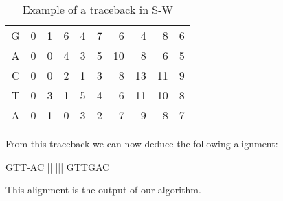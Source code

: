 \begin{enumerate}
\begin{table}[H]
\begin{tabular}{rrrrrrrrrr}
			\multicolumn{1}{r|}{G} & \multicolumn{1}{r|}{0} & \multicolumn{1}{r|}{1}                         & \multicolumn{1}{r|}{6}                         & \multicolumn{1}{r|}{4}                         & \multicolumn{1}{r|}{\cellcolor[HTML]{DAE8FC}7} & \multicolumn{1}{r|}{6}                          & \multicolumn{1}{r|}{4}                          & \multicolumn{1}{r|}{8}  & \multicolumn{1}{r|}{6} \\ \cline{2-10} 
			\multicolumn{1}{r|}{A} & \multicolumn{1}{r|}{0} & \multicolumn{1}{r|}{0}                         & \multicolumn{1}{r|}{4}                         & \multicolumn{1}{r|}{3}                         & \multicolumn{1}{r|}{5}                         & \multicolumn{1}{r|}{\cellcolor[HTML]{DAE8FC}10} & \multicolumn{1}{r|}{8}                          & \multicolumn{1}{r|}{6}  & \multicolumn{1}{r|}{5} \\ \cline{2-10} 
			\multicolumn{1}{r|}{C} & \multicolumn{1}{r|}{0} & \multicolumn{1}{r|}{0}                         & \multicolumn{1}{r|}{2}                         & \multicolumn{1}{r|}{1}                         & \multicolumn{1}{r|}{3}                         & \multicolumn{1}{r|}{8}                          & \multicolumn{1}{r|}{\cellcolor[HTML]{34CDF9}13} & \multicolumn{1}{r|}{11} & \multicolumn{1}{r|}{9} \\ \cline{2-10} 
			\multicolumn{1}{r|}{T} & \multicolumn{1}{r|}{0} & \multicolumn{1}{r|}{3}                         & \multicolumn{1}{r|}{1}                         & \multicolumn{1}{r|}{5}                         & \multicolumn{1}{r|}{4}                         & \multicolumn{1}{r|}{6}                          & \multicolumn{1}{r|}{11}                         & \multicolumn{1}{r|}{10} & \multicolumn{1}{r|}{8} \\ \cline{2-10} 
			\multicolumn{1}{r|}{A} & \multicolumn{1}{r|}{0} & \multicolumn{1}{r|}{1}                         & \multicolumn{1}{r|}{0}                         & \multicolumn{1}{r|}{3}                         & \multicolumn{1}{r|}{2}                         & \multicolumn{1}{r|}{7}                          & \multicolumn{1}{r|}{9}                          & \multicolumn{1}{r|}{8}  & \multicolumn{1}{r|}{7} \\ \cline{2-10} 
		\end{tabular}
		\caption{\centering Example of a traceback in S-W}
	\end{table}
	
	From this traceback we can now deduce the following alignment:
	
\begin{lcverbatim}
GTT-AC
||||||
GTTGAC
\end{lcverbatim}
	
	This alignment is the output of our algorithm.
	
\end{enumerate}

